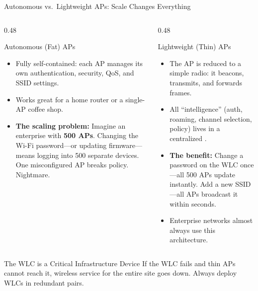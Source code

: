 \documentclass[aspectratio=169]{beamer}
\begin{document}
\begin{frame}{Autonomous vs.\ Lightweight APs: Scale Changes Everything}
    \begin{columns}[T]
        \begin{column}{0.48\textwidth}
            \begin{block}{Autonomous (Fat) APs}
                \footnotesize
                \begin{itemize}
                    \item Fully self-contained: each AP manages its own authentication, security, QoS, and SSID settings.
                    \item Works great for a home router or a single-AP coffee shop.
                    \item \textbf{The scaling problem:} Imagine an enterprise with \textbf{500 APs}. Changing the Wi-Fi password---or updating firmware---means logging into 500 separate devices. One misconfigured AP breaks policy. Nightmare.
                \end{itemize}
            \end{block}
        \end{column}
        \begin{column}{0.48\textwidth}
            \begin{block}{Lightweight (Thin) APs}
                \footnotesize
                \begin{itemize}
                    \item The AP is reduced to a simple radio: it beacons, transmits, and forwards frames.
                    \item All ``intelligence'' (auth, roaming, channel selection, policy) lives in a centralized .
                    \item \textbf{The benefit:} Change a password on the WLC once---all 500 APs update instantly. Add a new SSID---all APs broadcast it within seconds.
                    \item Enterprise networks almost always use this architecture.
                \end{itemize}
            \end{block}
        \end{column}
    \end{columns}
    \vspace{0.3em}
    \begin{alertblock}{The WLC is a Critical Infrastructure Device}
        \footnotesize
        If the WLC fails and thin APs cannot reach it, wireless service for the entire site goes down. Always deploy WLCs in redundant pairs.
    \end{alertblock}
\end{frame}
\end{document}
